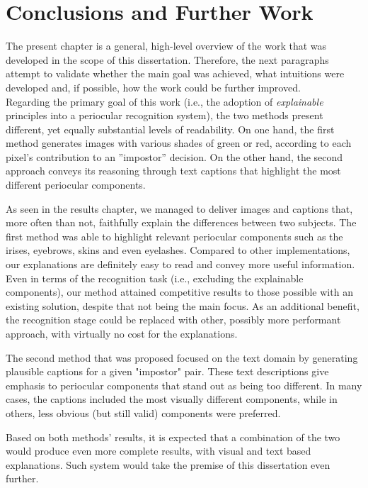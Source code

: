 \chapter{Conclusions and Further Work}
\label{chap5:conclusion_and_further_work}

The present chapter is a general, high-level overview of the work that was developed in the scope of this dissertation. Therefore, the next paragraphs attempt to validate whether the main goal was achieved, what intuitions were developed and, if possible, how the work could be further improved.\\

Regarding the primary goal of this work (i.e., the adoption of \textit{explainable} principles into a periocular recognition system), the two methods present different, yet equally substantial levels of readability. On one hand, the first method generates images with various shades of green or red, according to each pixel’s contribution to an ”impostor” decision. On the other hand, the second approach conveys its reasoning through text captions that highlight the most different periocular components.

As seen in the results chapter, we managed to deliver images and captions that, more often than not, faithfully explain the differences between two subjects. The first method was able to highlight relevant periocular components such as the irises, eyebrows, skins and even eyelashes. Compared to other implementations, our explanations are definitely easy to read and convey more useful information. Even in terms of the recognition task (i.e., excluding the explainable components), our method attained competitive results to those possible with an existing solution, despite that not being the main focus. As an additional benefit, the recognition stage could be replaced with other, possibly more performant approach, with virtually no cost for the explanations. 

The second method that was proposed focused on the text domain by generating plausible captions for a given "impostor" pair. These text descriptions give emphasis to periocular components that stand out as being too different. In many cases, the captions included the most visually different components, while in others, less obvious (but still valid) components were preferred. 

Based on both methods' results, it is expected that a combination of the two would produce even more complete results, with visual and text based explanations. Such system would take the premise of this dissertation even further.\\

